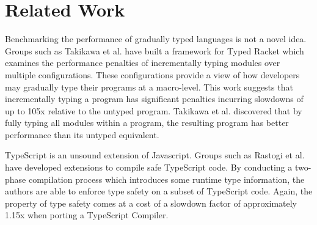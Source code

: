 \section{Related Work}
Benchmarking the performance of gradually typed languages is not a novel idea. Groups such as Takikawa et al. \cite{Takikawa:2016:SGT:2837614.2837630} have built a framework for Typed Racket which examines the performance penalties of incrementally typing modules over multiple configurations. These configurations provide a view of how developers may gradually type their programs at a macro-level. This work suggests that incrementally typing a program has significant penalties incurring slowdowns of up to 105x relative to the untyped program. Takikawa et al. discovered that by fully typing all modules within a program, the resulting program has better performance than its untyped equivalent.

TypeScript is an unsound extension of Javascript. Groups such as Rastogi et al. \cite{Rastogi:2015:SEG:2775051.2676971} have developed extensions to compile safe TypeScript code. By conducting a two-phase compilation process which introduces some runtime type information, the authors are able to enforce type safety on a subset of TypeScript code. Again, the property of type safety comes at a cost of a slowdown factor of approximately 1.15x when porting a TypeScript Compiler.